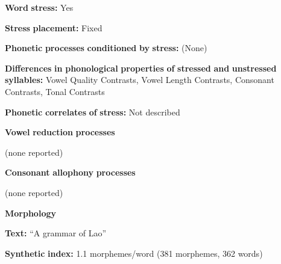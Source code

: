 \documentclass[output=paper]{langsci/langscibook}
\begin{document}
\begin{styleBody}
\textbf{Word} \textbf{stress:} Yes
\end{styleBody}

\begin{styleBody}
\textbf{Stress} \textbf{placement:} Fixed
\end{styleBody}

\begin{styleBody}
\textbf{Phonetic} \textbf{processes} \textbf{conditioned} \textbf{by} \textbf{stress:} (None)
\end{styleBody}

\begin{styleBody}
\textbf{Differences} \textbf{in} \textbf{phonological} \textbf{properties} \textbf{of} \textbf{stressed} \textbf{and} \textbf{unstressed} \textbf{syllables:} Vowel Quality Contrasts, Vowel Length Contrasts, Consonant Contrasts, Tonal Contrasts
\end{styleBody}

\begin{styleBody}
\textbf{Phonetic} \textbf{correlates} \textbf{of} \textbf{stress:} Not described
\end{styleBody}

\begin{styleBody}
\textbf{Vowel} \textbf{reduction} \textbf{processes}
\end{styleBody}

\begin{styleBody}
(none reported)
\end{styleBody}

\begin{styleBody}
\textbf{Consonant} \textbf{allophony} \textbf{processes}
\end{styleBody}

\begin{styleBody}
(none reported)
\end{styleBody}

\begin{styleBody}
\textbf{Morphology}
\end{styleBody}

\begin{styleBody}
\textbf{Text:} “A grammar of Lao” \citep[488-497]{Enfield2007}
\end{styleBody}

\begin{styleBody}
\textbf{Synthetic} \textbf{index:} 1.1 morphemes/word (381 morphemes, 362 words)
\end{styleBody}
\end{document}
